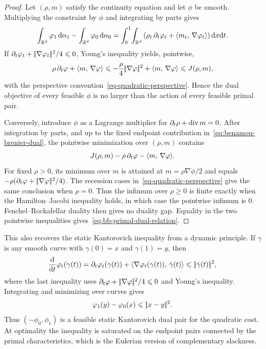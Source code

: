 \begin{proof}
	Let $(\rho,m)$ satisfy the continuity equation and let $\phi$ be smooth. Multiplying the constraint by $\phi$ and integrating by parts gives
	\[
		\int_{\mathbb{R}^d}\varphi_1\,\mathrm{d}\alpha_1
		-
		\int_{\mathbb{R}^d}\varphi_0\,\mathrm{d}\alpha_0
		=
		\int_0^1\!\int_{\mathbb{R}^d}
		\left(\rho_t\,\partial_t\varphi_t+\langle m_t,\,\nabla\varphi_t\rangle\right)\mathrm{d} x\mathrm{d} t.
	\]
	If $\partial_t\varphi_t+|\!| \nabla\varphi_t |\!|^2/4\leqslant0$, Young's inequality yields, pointwise,
	\[
		\rho\,\partial_t\varphi+\langle m,\,\nabla\varphi\rangle
		\leqslant
		-\frac{\rho}{4}|\!| \nabla\varphi |\!|^2+\langle m,\,\nabla\varphi\rangle
		\leqslant
		J(\rho,m),
	\]
	with the perspective convention~\eqref{eq-quadratic-perspective}. Hence the dual objective of every feasible $\phi$ is no larger than the action of every feasible primal pair.

	Conversely, introduce $\phi$ as a Lagrange multiplier for $\partial_t\rho+\operatorname{div} m=0$. After integration by parts, and up to the fixed endpoint contribution in~\eqref{eq:benamou-brenier-dual}, the pointwise minimization over $(\rho,m)$ contains
	\[
		J(\rho,m)-\rho\,\partial_t\varphi-\langle m,\,\nabla\varphi\rangle.
	\]
	For fixed $\rho>0$, its minimum over $m$ is attained at $m=\rho\nabla\phi/2$ and equals $-\rho(\partial_t\varphi+|\!| \nabla\varphi |\!|^2/4)$. The recession cases in~\eqref{eq-quadratic-perspective} give the same conclusion when \(\rho=0\). Thus the infimum over $\rho\geq0$ is finite exactly when the Hamilton--Jacobi inequality holds, in which case the pointwise infimum is $0$. Fenchel--Rockafellar duality then gives no duality gap. Equality in the two pointwise inequalities gives~\eqref{eq:bb-primal-dual-relation}.
\end{proof}

This also recovers the static Kantorovich inequality from a dynamic principle. If $\gamma$ is any smooth curve with $\gamma(0)=x$ and $\gamma(1)=y$, then
\[
	\frac{\mathrm{d}}{\mathrm{d} t}\varphi_t(\gamma(t))
	=
	\partial_t\varphi_t(\gamma(t))+\langle \nabla\varphi_t(\gamma(t)),\,\dot\gamma(t)\rangle
	\leqslant
	|\!| \dot\gamma(t) |\!|^2,
\]
where the last inequality uses $\partial_t\varphi+|\!| \nabla\varphi |\!|^2/4\leqslant0$ and Young's inequality. Integrating and minimizing over curves gives
\[
	\varphi_1(y)-\varphi_0(x)\leqslant|\!| x-y |\!|^2.
\]
Thus $(-\phi_0,\phi_1)$ is a feasible static Kantorovich dual pair for the quadratic cost. At optimality the inequality is saturated on the endpoint pairs connected by the primal characteristics, which is the Eulerian version of complementary slackness.


